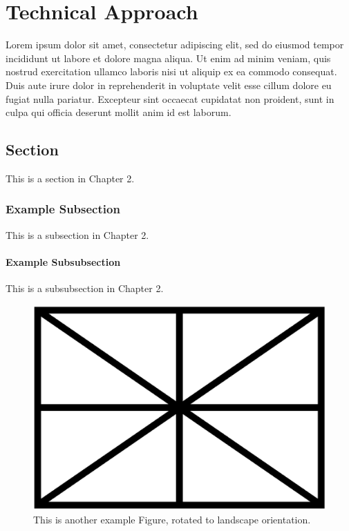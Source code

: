 \chapter{Technical Approach}
Lorem ipsum dolor sit amet, consectetur adipiscing elit, sed do eiusmod tempor incididunt ut labore et dolore magna aliqua. Ut enim ad minim veniam, quis nostrud exercitation ullamco laboris nisi ut aliquip ex ea commodo consequat. Duis aute irure dolor in reprehenderit in voluptate velit esse cillum dolore eu fugiat nulla pariatur. Excepteur sint occaecat cupidatat non proident, sunt in culpa qui officia deserunt mollit anim id est laborum.

\section{Section}

This is a section in Chapter 2.

\subsection{Example Subsection}

This is a subsection in Chapter 2.

\subsubsection{Example Subsubsection}

This is a subsubsection in Chapter 2.

\begin{figure}
\includegraphics[width=\textwidth]{./figures/exampleFigure.png}
\caption{This is another example Figure, rotated to landscape orientation.}
\label{LandscapeFigure}
\end{figure}
